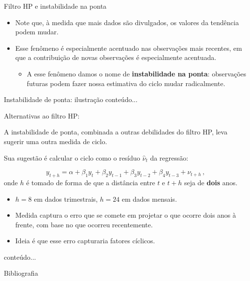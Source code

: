 \documentclass[11pt]{beamer}
\newenvironment{halfwideitemize}{\itemize\addtolength{\itemsep}{0.5em}}{\enditemize}
\begin{document}
\begin{frame}{Filtro HP e instabilidade na ponta}
	\begin{itemize}
		\item Note que, à medida que mais dados são divulgados, os valores da tendência podem mudar.
		\item Esse fenômeno é especialmente acentuado nas observações mais recentes, em que a contribuição de novas observações é especialmente acentuada.
		\begin{itemize}
			\item A esse fenômeno damos o nome de \textbf{instabilidade na ponta}: observações futuras podem fazer nossa estimativa do ciclo mudar radicalmente.
		\end{itemize} 
	\end{itemize}
\end{frame}

\begin{frame}{Instabilidade de ponta: ilustração}
	conteúdo...
\end{frame}

\begin{frame}{Alternativas ao filtro HP: \citet{Hamilton2019}}
	\begin{halfwideitemize}
		\item A instabilidade de ponta, combinada a outras debilidades do filtro HP, leva \citet{Hamilton2019} sugerir uma outra medida de ciclo.
		\item Sua sugestão é calcular o ciclo como o resíduo $\hat{\nu}_t$ da regressão:
		
		$$y_{t+h} = \alpha+\beta_1 y_{t} + \beta_2 y_{t-1} + \beta_3 y_{t-2} + \beta_4 y_{t-3} + \nu_{t+h} \, ,$$
		onde $h$ é tomado de forma de que a distância entre $t$ e $t+h$ seja de \textbf{dois} anos.
		\begin{itemize}
			\item $h=8$ em dados trimestrais, $h=24$ em dados mensais.
			\item Medida captura o erro que se comete em projetar o que ocorre dois anos à frente, com base no que ocorreu recentemente. 
			\item Ideia é que esse erro capturaria fatores cíclicos.
		\end{itemize}
	\end{halfwideitemize}
\end{frame}

\begin{frame}
	conteúdo...
\end{frame}

	\begin{frame}[allowframebreaks]{Bibliografia}
	\printbibliography
	\end{frame}
\end{document}
